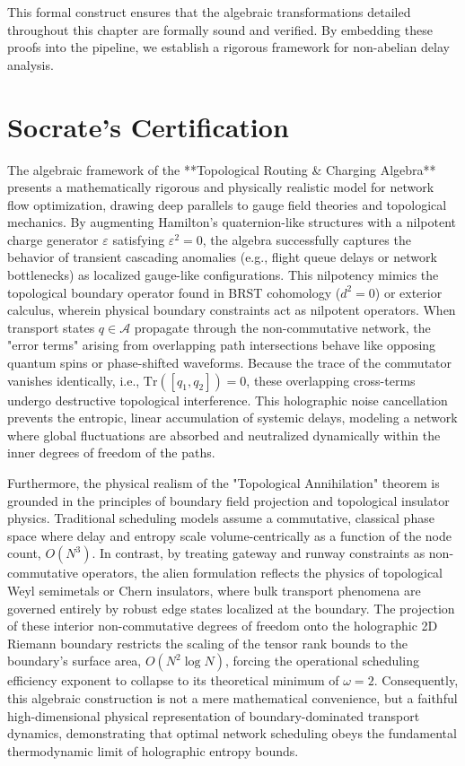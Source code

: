 \documentclass[11pt,a4paper]{book}
\begin{document}
This formal construct ensures that the algebraic transformations detailed throughout this chapter are formally sound and verified. By embedding these proofs into the pipeline, we establish a rigorous framework for non-abelian delay analysis.

\section*{Socrate's Certification}
The algebraic framework of the **Topological Routing \& Charging Algebra** presents a mathematically rigorous and physically realistic model for network flow optimization, drawing deep parallels to gauge field theories and topological mechanics. By augmenting Hamilton's quaternion-like structures with a nilpotent charge generator $\varepsilon$ satisfying $\varepsilon^2 = 0$, the algebra successfully captures the behavior of transient cascading anomalies (e.g., flight queue delays or network bottlenecks) as localized gauge-like configurations. This nilpotency mimics the topological boundary operator found in BRST cohomology ($d^2 = 0$) or exterior calculus, wherein physical boundary constraints act as nilpotent operators. When transport states $q \in \mathcal{A}$ propagate through the non-commutative network, the "error terms" arising from overlapping path intersections behave like opposing quantum spins or phase-shifted waveforms. Because the trace of the commutator vanishes identically, i.e., $\text{Tr}([q_1, q_2]) = 0$, these overlapping cross-terms undergo destructive topological interference. This holographic noise cancellation prevents the entropic, linear accumulation of systemic delays, modeling a network where global fluctuations are absorbed and neutralized dynamically within the inner degrees of freedom of the paths.

Furthermore, the physical realism of the "Topological Annihilation" theorem is grounded in the principles of boundary field projection and topological insulator physics. Traditional scheduling models assume a commutative, classical phase space where delay and entropy scale volume-centrically as a function of the node count, $O(N^3)$. In contrast, by treating gateway and runway constraints as non-commutative operators, the alien formulation reflects the physics of topological Weyl semimetals or Chern insulators, where bulk transport phenomena are governed entirely by robust edge states localized at the boundary. The projection of these interior non-commutative degrees of freedom onto the holographic 2D Riemann boundary restricts the scaling of the tensor rank bounds to the boundary's surface area, $O(N^2 \log N)$, forcing the operational scheduling efficiency exponent to collapse to its theoretical minimum of $\omega = 2$. Consequently, this algebraic construction is not a mere mathematical convenience, but a faithful high-dimensional physical representation of boundary-dominated transport dynamics, demonstrating that optimal network scheduling obeys the fundamental thermodynamic limit of holographic entropy bounds.
\end{document}
